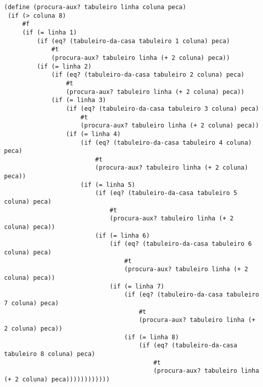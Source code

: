 \begin{lstlisting}[basicstyle=\ttfamily, caption="example"]
(define (procura-aux? tabuleiro linha coluna peca)
 (if (> coluna 8)
     #f
     (if (= linha 1)
         (if (eq? (tabuleiro-da-casa tabuleiro 1 coluna) peca)
             #t
             (procura-aux? tabuleiro linha (+ 2 coluna) peca))
         (if (= linha 2)
             (if (eq? (tabuleiro-da-casa tabuleiro 2 coluna) peca)
                 #t
                 (procura-aux? tabuleiro linha (+ 2 coluna) peca))
             (if (= linha 3)
                 (if (eq? (tabuleiro-da-casa tabuleiro 3 coluna) peca)
                     #t
                     (procura-aux? tabuleiro linha (+ 2 coluna) peca))
                 (if (= linha 4)
                     (if (eq? (tabuleiro-da-casa tabuleiro 4 coluna) peca)
                         #t
                         (procura-aux? tabuleiro linha (+ 2 coluna) peca))
                     (if (= linha 5)
                         (if (eq? (tabuleiro-da-casa tabuleiro 5 coluna) peca)
                             #t
                             (procura-aux? tabuleiro linha (+ 2 coluna) peca))
                         (if (= linha 6)
                             (if (eq? (tabuleiro-da-casa tabuleiro 6 coluna) peca)
                                 #t
                                 (procura-aux? tabuleiro linha (+ 2 coluna) peca))
                             (if (= linha 7)
                                 (if (eq? (tabuleiro-da-casa tabuleiro 7 coluna) peca)
                                     #t
                                     (procura-aux? tabuleiro linha (+ 2 coluna) peca))
                                 (if (= linha 8)
                                     (if (eq? (tabuleiro-da-casa tabuleiro 8 coluna) peca)
                                         #t
                                         (procura-aux? tabuleiro linha (+ 2 coluna) peca))))))))))))

                                         \end{lstlisting}
